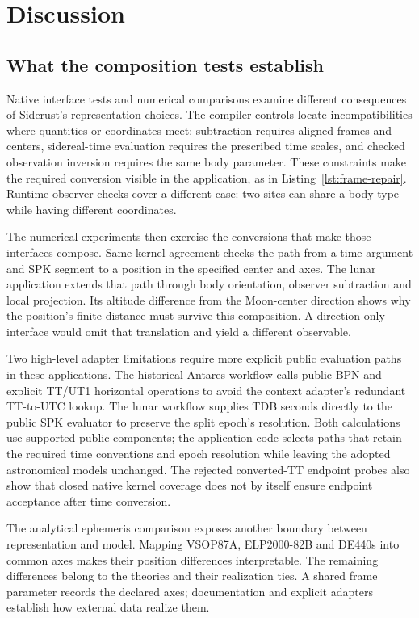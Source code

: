 \section{Discussion}

\subsection{What the composition tests establish}

Native interface tests and numerical comparisons examine different consequences of Siderust's
representation choices. The compiler controls locate incompatibilities where quantities or
coordinates meet: subtraction requires aligned frames and centers, sidereal-time evaluation
requires the prescribed time scales, and checked observation inversion requires the same body
parameter. These constraints make the required conversion visible in the application, as in
Listing~\ref{lst:frame-repair}. Runtime observer checks cover a different case: two sites can share
a body type while having different coordinates.

The numerical experiments then exercise the conversions that make those interfaces compose.
Same-kernel agreement checks the path from a time argument and SPK segment to a position in the
specified center and axes. The lunar application extends that path through body orientation,
observer subtraction and local projection. Its altitude difference from the Moon-center direction
shows why the position's finite distance must survive this composition. A direction-only interface
would omit that translation and yield a different observable.

Two high-level adapter limitations require more explicit public evaluation paths in these
applications. The historical Antares workflow calls public BPN and explicit TT/UT1 horizontal
operations to avoid the context adapter's redundant TT-to-UTC lookup. The lunar workflow supplies
TDB seconds directly to the public SPK evaluator to preserve the split epoch's resolution. Both
calculations use supported public components; the application code selects paths that retain the
required time conventions and epoch resolution while leaving the adopted astronomical models
unchanged. The rejected converted-TT endpoint probes also show that closed native kernel coverage
does not by itself ensure endpoint acceptance after time conversion.

The analytical ephemeris comparison exposes another boundary between representation and model.
Mapping VSOP87A, ELP2000-82B and DE440s into common axes makes their position differences
interpretable. The remaining differences belong to the theories and their realization ties. A
shared frame parameter records the declared axes; documentation and explicit adapters establish how
external data realize them.

